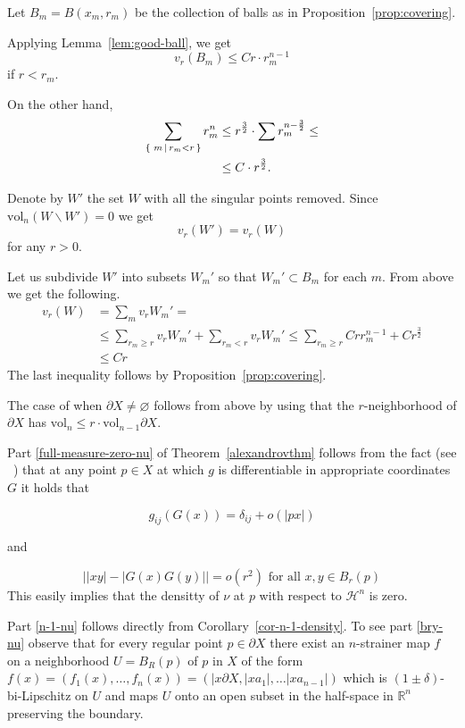 \documentclass[12pt,leqno,intlimits]{amsart}
\numberwithin{equation}{section}
\theoremstyle{definition}
\theoremstyle{remark}
\newcommand{\vol}{\mathrm{vol}}
\newcommand{\R}{\mathbb{R}}
\newcommand*{\set}[2]{\left\{\,\left.{#1}\vphantom{#2}\,\right|\,{#2}\,\right\}}
\def\emptyset{\varnothing}
\begin{document}
Let $B_m=B(x_m,r_m)$ be the collection of balls as in Proposition~\ref{prop:covering}.

Applying Lemma~\ref{lem:good-ball},
we get
$$v_r(B_m)\le Cr\cdot r_m^{n-1}$$
if $r<r_m$.

On the other hand,
\begin{align*}
\sum_{\set{m}{r_m<r}}r_m^n
&\le r^{\frac32}\cdot\sum r_m^{n-\frac32}\le
\\
&\le C\cdot r^{\frac32}.
\end{align*}

Denote by $W'$ the set $W$ with all the singular points removed.
Since $\vol_n(W\backslash W')=0$ we get
\[v_r(W')=v_r(W)\]
for any $r>0$.

Let us subdivide $W'$ into subsets $W_m'$ so that
$W_m'\subset B_m$ for each $m$.
From above we get the following.
\begin{align*}
v_r(W)
&= \sum_m v_r W_m'=
\\
&\le \sum_{r_m\ge r} v_r W_m'
+
 \sum_{r_m< r} v_r W_m'\le  \sum_{r_m\ge r}Crr_m^{n-1}+Cr^{\frac 3 2}
\\
&\le Cr
\end{align*}
The last inequality follows by  Proposition~\ref{prop:covering}.



The case of when $\partial X\ne\emptyset$ follows from above by using that the $r$-neighborhood of $\partial X$ has $\vol_n\le r\cdot \vol_{n-1}\partial X$.

Part \eqref{full-measure-zero-nu} of Theorem~\ref{alexandrovthm}  follows from the fact (see ~\cite{Per-DC}) that at any point $p\in X$ at which $g$ is differentiable in appropriate coordinates $G$ it holds that

\[
g_{ij}(G(x))=\delta_{ij}+o(|px|)
\]

and

\[
 \big| |xy|-|G(x)G(y)|\big|=o(r^2) \text{ for all } x,y\in B_r(p)
\]
This easily implies that the densitty of $\nu$ at $p$ with respect to $\mathcal H^n$  is zero.

Part \eqref{n-1-nu} follows directly from Corollary~\ref {cor-n-1-density}. To see part \eqref{bry-nu}  observe that  for every regular point $p\in\partial X$ there exist an $n$-strainer map $f$ on a neighborhood $U=B_R(p)$ of $p$ in $X$ of the form $f(x)=(f_1(x),\ldots, f_n(x))=(|x\partial X, |xa_1|,\ldots |x a_{n-1}|)$ which is $(1\pm\delta)$-bi-Lipschitz on $U$ and maps $U$ onto an open subset in the half-space in $\R^n$ preserving the boundary.
\end{document}
